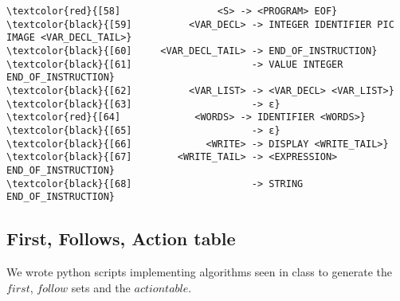 \begin{Verbatim}[commandchars=\\\{\}]
\textcolor{red}{[58]                 <S> -> <PROGRAM> EOF}
\textcolor{black}{[59]          <VAR_DECL> -> INTEGER IDENTIFIER PIC IMAGE <VAR_DECL_TAIL>}
\textcolor{black}{[60]     <VAR_DECL_TAIL> -> END_OF_INSTRUCTION}
\textcolor{black}{[61]                     -> VALUE INTEGER END_OF_INSTRUCTION}
\textcolor{black}{[62]          <VAR_LIST> -> <VAR_DECL> <VAR_LIST>}
\textcolor{black}{[63]                     -> ε}
\textcolor{red}{[64]             <WORDS> -> IDENTIFIER <WORDS>}
\textcolor{black}{[65]                     -> ε}
\textcolor{black}{[66]             <WRITE> -> DISPLAY <WRITE_TAIL>}
\textcolor{black}{[67]        <WRITE_TAIL> -> <EXPRESSION> END_OF_INSTRUCTION}
\textcolor{black}{[68]                     -> STRING END_OF_INSTRUCTION}
\end{Verbatim}
\endgroup

\subsection{First, Follows, Action table}

We wrote python scripts implementing algorithms seen in class to generate the $first$, $follow$ sets and the $action table$.

